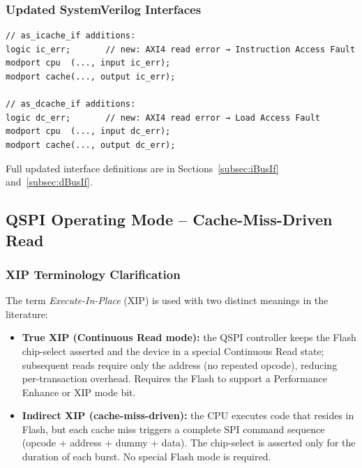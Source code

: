 \subsubsection{Updated SystemVerilog Interfaces}

\begin{verbatim}
// as_icache_if additions:
logic ic_err;       // new: AXI4 read error → Instruction Access Fault
modport cpu  (..., input ic_err);
modport cache(..., output ic_err);

// as_dcache_if additions:
logic dc_err;       // new: AXI4 read error → Load Access Fault
modport cpu  (..., input dc_err);
modport cache(..., output dc_err);
\end{verbatim}

Full updated interface definitions are in
Sections~\ref{subsec:iBusIf} and~\ref{subsec:dBusIf}.

\subsection{QSPI Operating Mode -- Cache-Miss-Driven Read}
\label{subsec:qspiMode}

\subsubsection{XIP Terminology Clarification}

The term \emph{Execute-In-Place} (XIP) is used with two distinct meanings
in the literature:

\begin{itemize}
  \item \textbf{True XIP (Continuous Read mode):} the QSPI controller
    keeps the Flash chip-select asserted and the device in a special
    Continuous Read state; subsequent reads require only the address
    (no repeated opcode), reducing per-transaction overhead.
    Requires the Flash to support a Performance Enhance or XIP mode bit.
  \item \textbf{Indirect XIP (cache-miss-driven):} the CPU executes code
    that resides in Flash, but each cache miss triggers a complete SPI
    command sequence (opcode + address + dummy + data).
    The chip-select is asserted only for the duration of each burst.
    No special Flash mode is required.
\end{itemize}

